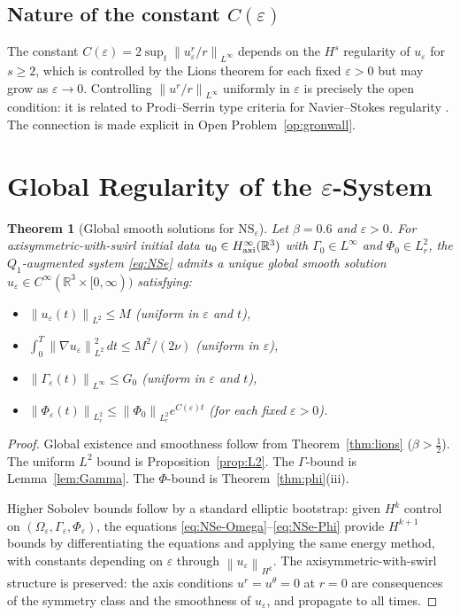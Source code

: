 \documentclass{article}
\newtheorem{theorem}{Theorem}[section]
\theoremstyle{definition}
\theoremstyle{remark}
\newcommand{\R}{\mathbb{R}}
\newcommand{\e}{\varepsilon}
\newcommand{\norm}[1]{\left\|#1\right\|}
\begin{document}
\subsection{Nature of the constant \texorpdfstring{$C(\e)$}{C(epsilon)}}

The constant $C(\e) = 2\sup_t\norm{u_\e^r/r}_{L^\infty}$ depends on the
$H^s$ regularity of $u_\e$ for $s \ge 2$, which is controlled by the
Lions theorem for each fixed $\e > 0$ but may grow as $\e\to 0$.
Controlling $\norm{u^r/r}_{L^\infty}$ uniformly in $\e$ is precisely the
open condition: it is related to Prodi--Serrin type criteria for
Navier--Stokes regularity \cite{Serrin1962}.  The connection is made
explicit in Open Problem~\ref{op:gronwall}.

\section{Global Regularity of the \texorpdfstring{$\e$}{epsilon}-System}
\label{sec:global}

\begin{theorem}[Global smooth solutions for $\mathrm{NS}_\e$]%
  \label{thm:uniform}
  Let $\beta = 0.6$ and $\e > 0$.  For axisymmetric-with-swirl initial
  data $u_0 \in H^\infty_{\rm axi}(\R^3)$ with $\Gamma_0\in L^\infty$
  and $\Phi_0 \in L^2_r$, the $Q_1$-augmented system \eqref{eq:NSe}
  admits a unique global smooth solution
  $u_\e\in C^\infty(\R^3\times[0,\infty))$ satisfying:
  \begin{itemize}
    \item $\norm{u_\e(t)}_{L^2} \le M$ \quad (uniform in $\e$ and $t$),
    \item $\displaystyle\int_0^T\norm{\nabla u_\e}_{L^2}^2\,dt
      \le M^2/(2\nu)$ \quad (uniform in $\e$),
    \item $\norm{\Gamma_\e(t)}_{L^\infty} \le G_0$ \quad (uniform in $\e$ and $t$),
    \item $\norm{\Phi_\e(t)}_{L^2_r} \le \norm{\Phi_0}_{L^2_r}
      e^{C(\e)t}$ \quad (for each fixed $\e > 0$).
  \end{itemize}
\end{theorem}
\begin{proof}
  Global existence and smoothness follow from Theorem~\ref{thm:lions}
  ($\beta > \frac{1}{2}$).  The uniform $L^2$ bound is
  Proposition~\ref{prop:L2}.  The $\Gamma$-bound is Lemma~\ref{lem:Gamma}.
  The $\Phi$-bound is Theorem~\ref{thm:phi}(iii).

  Higher Sobolev bounds follow by a standard elliptic bootstrap:
  given $H^k$ control on $(\Omega_\e, \Gamma_\e, \Phi_\e)$, the
  equations \eqref{eq:NSe-Omega}--\eqref{eq:NSe-Phi} provide $H^{k+1}$
  bounds by differentiating the equations and applying the same energy
  method, with constants depending on $\e$ through $\norm{u_\e}_{H^k}$.
  The axisymmetric-with-swirl structure is preserved: the axis conditions
  $u^r = u^\theta = 0$ at $r=0$ are consequences of the symmetry class
  and the smoothness of $u_\e$, and propagate to all times.
\end{proof}
\end{document}
